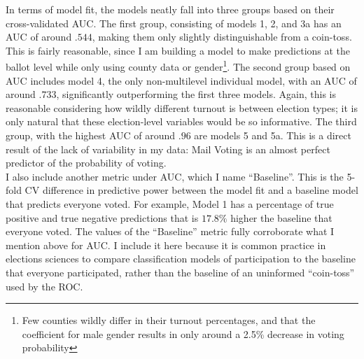\documentclass[12pt,twoside]{reedthesis}
\begin{document}
  In terms of model fit, the models neatly fall into three groups based on
  their cross-validated AUC. The first group, consisting of models 1, 2,
  and 3a has an AUC of around \(.544\), making them only slightly
  distinguishable from a coin-toss. This is fairly reasonable, since I am
  building a model to make predictions at the ballot level while only
  using county data or gender\footnote{Few counties wildly differ in their
    turnout percentages, and that the coefficient for male gender results
    in only around a 2.5\% decrease in voting probability}. The second
  group based on AUC includes model 4, the only non-multilevel individual
  model, with an AUC of around \(.733\), significantly outperforming the
  first three models. Again, this is reasonable considering how wildly
  different turnout is between election types; it is only natural that
  these election-level variables would be so informative. The third group,
  with the highest AUC of around \(.96\) are models 5 and 5a. This is a
  direct result of the lack of variability in my data: Mail Voting is an
  almost perfect predictor of the probability of voting.\\
  I also include another metric under AUC, which I name ``Baseline''. This
  is the 5-fold CV difference in predictive power between the model fit
  and a baseline model that predicts everyone voted. For example, Model 1
  has a percentage of true positive and true negative predictions that is
  \(17.8\%\) higher the baseline that everyone voted. The values of the
  ``Baseline'' metric fully corroborate what I mention above for AUC. I
  include it here because it is common practice in elections sciences to
  compare classification models of participation to the baseline that
  everyone participated, rather than the baseline of an uninformed
  ``coin-toss'' used by the ROC.
  
\end{document}
